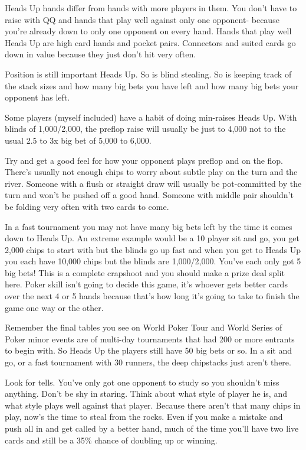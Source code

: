 Heads Up hands differ from hands with more players in them.
You don't have to raise with QQ and hands that play well
against only one opponent- because you're already down
to only one opponent on every hand. Hands that play
well Heads Up are high card hands and pocket pairs.
Connectors and suited cards go down in value because
they just don't hit very often.

Position is still important Heads Up. So is blind stealing.
So is keeping track of the stack sizes and how many big bets
you have left and how many big bets your opponent has left.

Some players (myself included) have a habit of doing min-raises
Heads Up. With blinds of 1,000/2,000, the preflop raise will usually
be just to 4,000 not to the usual 2.5 to 3x big bet of 5,000 to 6,000.

Try and get a good feel for how your opponent plays
preflop and on the flop. There's usually not enough
chips to worry about subtle play on the turn and the river.
Someone with a flush or straight draw will usually be
pot-committed by the turn and won't be pushed off a
good hand. Someone with middle pair shouldn't be folding
very often with two cards to come.

In a fast tournament you may not have many big bets left by
the time it comes down to Heads Up. An extreme example would
be a 10 player sit and go, you get 2,000 chips to start with
but the blinds go up fast and when you get to Heads Up
you each have 10,000 chips but the blinds are 1,000/2,000.
You've each only got 5 big bets! This is a complete
crapshoot and you should make a prize deal split here. Poker skill
isn't going to decide this game, it's whoever gets better
cards over the next 4 or 5 hands because that's how long
it's going to take to finish the game one way or the other.

Remember the final tables you see on World Poker Tour and
World Series of Poker minor events are of multi-day tournaments that had
200 or more entrants to begin with. So Heads Up the players
still have 50 big bets or so. In a sit and go, or
a fast tournament with 30 runners, the deep chipstacks
just aren't there.

Look for tells. You've only got one opponent to study so
you shouldn't miss anything. Don't be shy in staring.
Think about what style of player he is, and what style
plays well against that player. Because there aren't
that many chips in play, now's the time to steal from
the rocks. Even if you make a mistake and push all in
and get called by a better hand, much of the time you'll
have two live cards and still be a 35\% chance of doubling
up or winning.


